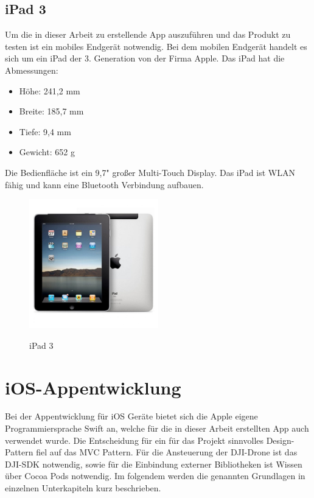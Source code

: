 \subsection{iPad 3}
Um die in dieser Arbeit zu erstellende App auszuführen und das Produkt zu testen ist ein mobiles Endgerät notwendig. 
\newline
Bei dem mobilen Endgerät handelt es sich um ein iPad der 3. Generation von der Firma Apple.
\newline 
Das iPad hat die Abmessungen:
\begin{itemize}
	\item Höhe: 241,2 mm
	\item Breite: 185,7 mm
	\item Tiefe: 9,4 mm
	\item Gewicht: 652 g
\end{itemize}
Die Bedienfläche ist ein 9,7" großer Multi-Touch Display. Das iPad ist \acl{WLAN} fähig und kann eine Bluetooth Verbindung aufbauen.
\begin{figure}[H]
	\begin{center}
		{\includegraphics[width=0.5\textwidth]{images/iPad3.jpg}}
		\caption{iPad 3}
	\end{center}
\end{figure}



\section{iOS-Appentwicklung}\label{sec:ioS-Appentwicklung}
Bei der Appentwicklung für iOS Geräte bietet sich die Apple eigene Programmiersprache Swift an, welche für die in dieser Arbeit erstellten App auch verwendet wurde. 
\newline
Die Entscheidung für ein für das Projekt sinnvolles Design-Pattern fiel auf das \acf{MVC} Pattern.
\newline
Für die Ansteuerung der DJI-Drone ist das DJI-SDK notwendig, sowie für die Einbindung externer Bibliotheken ist Wissen über Cocoa Pods notwendig.
\newline
Im folgendem werden die genannten Grundlagen in einzelnen Unterkapiteln kurz beschrieben.

